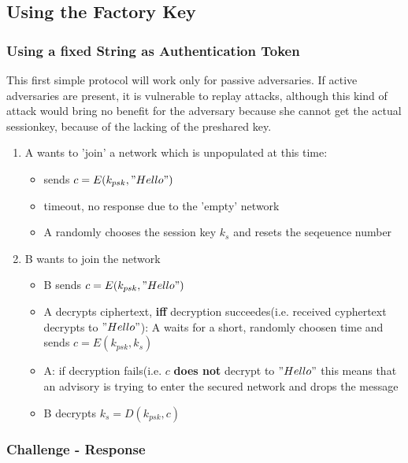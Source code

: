 \subsection{Using the Factory Key}

\subsubsection{Using a fixed String as Authentication Token}

This first simple protocol will work only for passive adversaries. If active adversaries are present, it is vulnerable to replay attacks, although
this kind of attack would bring no benefit for the adversary because she cannot get the actual sessionkey, because of the lacking of the preshared key.

\begin{enumerate}
 \item A wants to 'join' a network which is unpopulated at this time:
\begin{itemize}
 \item sends $c=E(k_{psk}, "Hello")$
 \item timeout, no response due to the 'empty' network
 \item A randomly chooses the session key $k_s$ and resets the seqeuence number
\end{itemize}
\item B wants to join the network
\begin{itemize}
 \item B sends $c=E(k_{psk}, "Hello")$
 \item A decrypts ciphertext, \textbf{iff} decryption succeedes(i.e. received cyphertext decrypts to $"Hello"$): A waits for a short, randomly choosen time and sends $c=E(k_{psk}, k_s)$
 \item A: if decryption fails(i.e. $c$ \textbf{does not} decrypt to $"Hello"$ this means
 that an advisory is trying to enter the secured network and drops the message
 \item B decrypts $k_s = D(k_{psk}, c)$
\end{itemize}
\end{enumerate}

\subsubsection{Challenge - Response}

